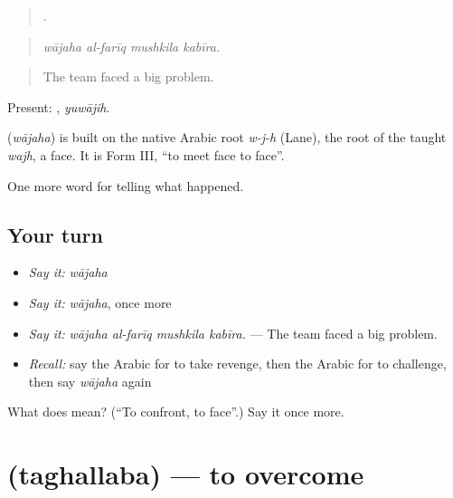 \begin{quote}
   .
\end{quote}

\begin{quote}
\emph{wājaha al-farīq mushkila kabīra.}
\end{quote}

\begin{quote}
The team faced a big problem.
\end{quote}

Present: , \emph{yuwājih}.

\begin{cousinweb}
\textbf{} (\emph{wājaha}) is built on the native Arabic root \emph{w-j-h} (Lane), the root of the taught \emph{wajh}, a face. It is Form III, \textquotedblleft{}to meet face to face\textquotedblright{}.
\end{cousinweb}

\begin{grammarlens}[title={What you've built}]
One more word for telling what happened.
\end{grammarlens}

\subsection*{Your turn}
\begin{itemize}
\raggedright
  \item \emph{Say it:} \emph{wājaha}
  \item \emph{Say it:} \emph{wājaha}, once more
  \item \emph{Say it:} \emph{wājaha al-farīq mushkila kabīra.} — The team faced a big problem.
  \item \emph{Recall:} say the Arabic for to take revenge, then the Arabic for to challenge, then say \emph{wājaha} again
\end{itemize}

\begin{tcolorbox}[breakable,colback=teal!4,colframe=teal!35!black,title={Before you move on}]
What does  mean? (\textquotedblleft{}To confront, to face\textquotedblright{}.) Say it once more.
\end{tcolorbox}
\section[\texorpdfstring{\ar{تغلب} (taghallaba)}{تغلب (taghallaba)}]{ (taghallaba) — to overcome}

